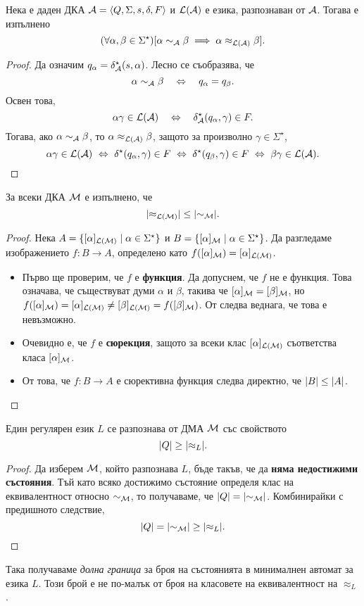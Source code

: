 \begin{thm}
  \label{th:rel-finer}
  Нека е даден ДКА $\mathcal{A} = \langle{Q,\Sigma,s,\delta,F}\rangle$ и $\mathcal{L}(\mathcal{A})$ е езика, разпознаван от $\mathcal{A}$. Тогава е изпълнено
  \[(\forall \alpha,\beta \in \Sigma^\star)[\alpha\sim_{\mathcal{A}}\beta \implies \alpha\approx_{\mathcal{L}(\mathcal{A})}\beta].\]
\end{thm}
\begin{proof}
  Да означим $q_\alpha = \delta^\star_{\mathcal{A}}(s, \alpha)$.
  Лесно се съобразява, че 
  \[\alpha \sim_{\mathcal{A}} \beta\quad\Leftrightarrow\quad q_\alpha = q_\beta.\]
  Освен това, 
  \[\alpha\gamma \in \mathcal{L}(\mathcal{A})\quad \Leftrightarrow\quad \delta^\star_{\mathcal{A}}(q_\alpha, \gamma) \in F.\]
  Тогава, ако $\alpha \sim_{\mathcal{A}} \beta$, то  $\alpha \approx_{\mathcal{L}(\mathcal{A})}\beta$, защото за произволно $\gamma \in \Sigma^\star$,
  \[\alpha\gamma \in \L(\A)\ \Leftrightarrow\ \delta^\star(q_\alpha,\gamma) \in F\ \Leftrightarrow\ \delta^\star(q_\beta, \gamma)\in F\ \Leftrightarrow\ \beta\gamma \in \L(\A).\]  
\end{proof}

\begin{cor}
  За всеки ДКА $\mathcal{M}$ е изпълнено, че
  \[\lvert{\approx_{\mathcal{L}(\mathcal{M})}}\rvert \leq \lvert{\sim_{\mathcal{M}}}\rvert.\]
\end{cor}
\begin{proof}
  Нека $A = \{[\alpha]_{\mathcal{L}(\mathcal{M})} \mid \alpha\in\Sigma^\star\}$ и $B = \{[\alpha]_{\mathcal{M}} \mid \alpha\in\Sigma^\star\}$.
  Да разгледаме изображението $f:B\to A$, определено като $f([\alpha]_{\mathcal{M}}) = [\alpha]_{\mathcal{L}(\mathcal{M})}$.
  \begin{itemize}
  \item 
    Първо ще проверим, че $f$ е {\bf функция}. Да допуснем, че $f$ не е функция.
    Това означава, че съществуват думи $\alpha$ и $\beta$, такива че
    $[\alpha]_{\mathcal{M}} = [\beta]_{\mathcal{M}}$, но $f([\alpha]_{\mathcal{M}}) = [\alpha]_{\mathcal{L}(\mathcal{M})} \neq [\beta]_{\mathcal{L}(\mathcal{M})} = f([\beta]_{\mathcal{M}})$.
    От  следва веднага, че това е невъзможно.
  \item
    Очевидно е, че $f$ е {\bf сюрекция}, защото за всеки клас $[\alpha]_{\mathcal{L}(\mathcal{M})}$ съответства класа $[\alpha]_{\mathcal{M}}$.
  \item
    От това, че $f:B\to A$ е сюрективна функция следва директно, че $\lvert{B}\rvert \leq \lvert{A}\rvert$.
  \end{itemize}
\end{proof}

\begin{cor}
  \label{cor:upper-bound}
  Един регулярен език $L$ се разпознава от ДМА $\mathcal{M}$ със свойството
  \[\lvert{Q}\rvert \geq \lvert{\approx_L}\rvert.\]
\end{cor}
\begin{proof}
  Да изберем $\mathcal{M}$, който разпознава $L$, бъде такъв, че да {\bf няма недостижими състояния}.
  Тъй като всяко достижимо състояние определя клас на еквивалентност относно $\sim_{\mathcal{M}}$,
  то получаваме, че $\lvert{Q}\rvert = \lvert{\sim_{\mathcal{M}}}\rvert$.
  Комбинирайки с предишното следствие, 
  \[\lvert{Q}\rvert = \lvert{\sim_{\mathcal{M}}}\rvert \geq \lvert{\approx_L}\rvert.\]
\end{proof}
Така получаваме {\em долна граница} за броя на състоянията в минималнен автомат за езика $L$.
Този брой е не по-малък от броя на класовете на еквивалентност на $\approx_L$.

